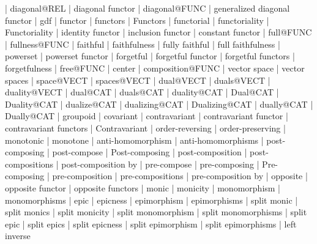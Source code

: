     |   diagonal@REL
    |   diagonal functor
    |   diagonal@FUNC
    |   generalized diagonal functor
    |   gdf
    |   functor
    |   functors
    |   Functors
    |   functorial
    |   functoriality
    |   Functoriality
    |   identity functor
    |   inclusion functor
    |   constant functor
    |   full@FUNC
    |   fullness@FUNC
    |   faithful
    |   faithfulness
    |   fully faithful
    |   full faithfulness
    |   powerset
    |   powerset functor
    |   forgetful
    |   forgetful functor
    |   forgetful functors
    |   forgetfulness
    |   free@FUNC
    |   center
    |   composition@FUNC
    |   vector space
    |   vector spaces
    |   space@VECT
    |   spaces@VECT
    |   dual@VECT
    |   duals@VECT
    |   duality@VECT
    |   dual@CAT
    |   duals@CAT
    |   duality@CAT
    |   Dual@CAT
    |   Duality@CAT
    |   dualize@CAT
    |   dualizing@CAT
    |   Dualizing@CAT
    |   dually@CAT
    |   Dually@CAT
    |   groupoid
    |   covariant
    |   contravariant
    |   contravariant functor
    |   contravariant functors
    |   Contravariant
    |   order-reversing
    |   order-preserving
    |   monotonic
    |   monotone
    |   anti-homomorphism
    |   anti-homomorphisms
    |   post-composing
    |   post-compose
    |   Post-composing
    |   post-composition
    |   post-compositions
    |   post-composition by
    |   pre-compose
    |   pre-composing
    |   Pre-composing
    |   pre-composition
    |   pre-compositions
    |   pre-composition by
    |   opposite
    |   opposite functor
    |   opposite functors
    |   monic
    |   monicity
    |   monomorphism
    |   monomorphisms
    |   epic
    |   epicness
    |   epimorphism
    |   epimorphisms
    |   split monic
    |   split monics
    |   split monicity
    |   split monomorphism
    |   split monomorphisms
    |   split epic
    |   split epics
    |   split epicness
    |   split epimorphism
    |   split epimorphisms
    |   left inverse
